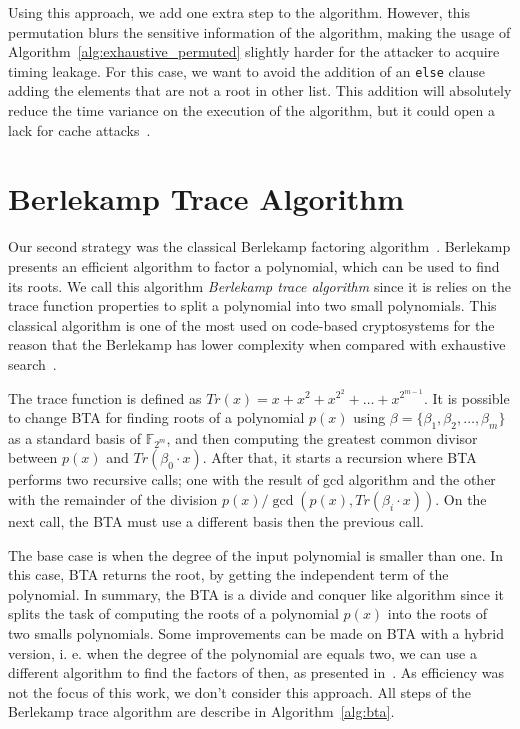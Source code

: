 Using this approach, we add one extra step to the algorithm. However, this permutation blurs the sensitive information of the algorithm, making the usage of Algorithm~\ref{alg:exhaustive_permuted} slightly harder for the attacker to acquire timing leakage. For this case, we want to avoid the addition of an \texttt{else} clause adding the elements that are not a root in other list. This addition will absolutely reduce the time variance on the execution of the algorithm, but it could open a lack for cache attacks~\cite{dan2005}.


\section{Berlekamp Trace Algorithm}
Our second strategy was the classical Berlekamp factoring algorithm~\cite{berlekamp1970factoring}. Berlekamp presents an efficient algorithm to factor a polynomial, which can be used to find its roots. We call this algorithm \emph{Berlekamp trace algorithm} since it is relies on the trace function properties to split a polynomial into two small polynomials. This classical algorithm is one of the most used on code-based cryptosystems for the reason that the Berlekamp has lower complexity when compared with exhaustive search~\cite{biswas2009efficient}. 

The trace function is defined as $Tr(x) = x + x^{2} + x^{2^{2}} + \dots + x^{2^{m-1}}$. It is possible to change BTA for finding roots of a polynomial $p(x)$ using $\beta = \{\beta_1, \beta_2, \ldots, \beta_m\}$ as a standard basis of $\mathbb{F}_{2^{m}}$, and then computing the greatest common divisor between $p(x)$ and $Tr(\beta_0 \cdot x)$. After that, it starts a recursion where BTA performs two recursive calls; one with the result of gcd algorithm and the other with the remainder of the division $p(x) / \gcd(p(x), Tr(\beta_i \cdot x))$. On the next call, the BTA must use a different basis then the previous call. 

The base case is when the degree of the input polynomial is smaller than one. In this case, BTA returns the root, by getting the independent term of the polynomial. In summary, the BTA is a divide and conquer like algorithm since it splits the task of computing the roots of a polynomial $p(x)$ into the roots of two smalls polynomials. Some improvements can be made on BTA with a hybrid version, i. e. when the degree of the polynomial are equals two, we can use a different algorithm to find the factors of then, as presented in~\cite{strenzke2012fast}. As efficiency was not the focus of this work, we don't consider this approach. All steps of the Berlekamp trace algorithm are describe in Algorithm~\ref{alg:bta}.


